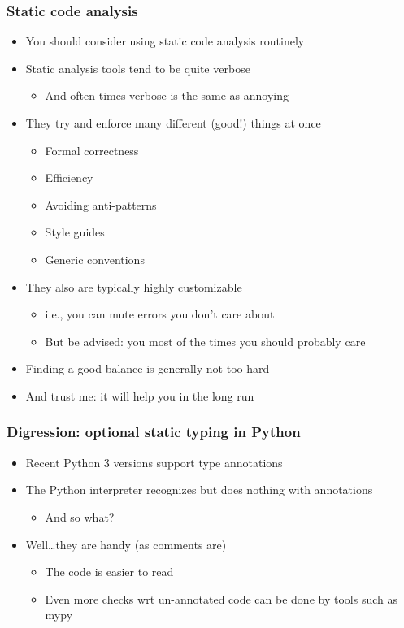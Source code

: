 \documentclass[9pt]{beamer}
\begin{document}
\begin{frame}
  \frametitle{Static code analysis}
  \begin{itemize}
  \item \alert{You should consider using static code analysis routinely}
  \item Static analysis tools tend to be quite verbose
    \begin{itemize}
    \item And often times verbose is the same as annoying
    \end{itemize}
  \item They try and enforce many different (good!) things at once
    \begin{itemize}
    \item Formal correctness
    \item Efficiency
    \item Avoiding anti-patterns
    \item Style guides
    \item Generic conventions
    \end{itemize}
  \item They also are typically highly customizable
    \begin{itemize}
    \item i.e., you can mute errors you don't care about
    \item But be advised: you most of the times you should probably care
    \end{itemize}
  \item \alert{Finding a good balance is generally not too hard}
  \item And trust me: it will help you in the long run
  \end{itemize}
\end{frame}


\begin{frame}
  \frametitle{Digression: optional static typing in Python}
  
  
  \begin{itemize}
  \item Recent Python 3 versions support type annotations
  \item \alert{The Python interpreter recognizes but does nothing with
    annotations}
    \begin{itemize}
    \item And so what?
    \end{itemize}
  \item Well\ldots they are handy (as comments are)
    \begin{itemize}
    \item The code is easier to read
    \item Even more checks wrt un-annotated code can be done by tools such as
      mypy
    \end{itemize}
  \end{itemize}
\end{frame}
\end{document}
